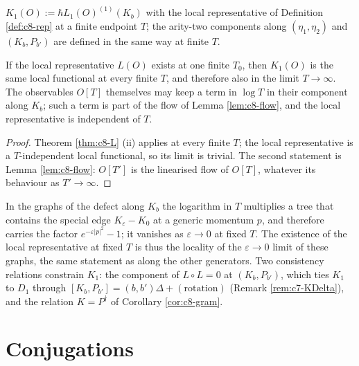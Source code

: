 \begin{definition}
\label{def:c8-K}
$K_1(O):=\hbar L_1(O)^{(1)}(K_b)$ with the local representative of Definition \ref{def:c8-rep} at a finite endpoint $T$; the arity-two components along $(\eta_1,\eta_2)$ and $(K_b,P_{b'})$ are defined in the same way at finite $T$.
\end{definition}

\begin{theorem}
\label{thm:c8-K}
If the local representative $L(O)$ exists at one finite $T_0$, then $K_1(O)$ is the same local functional at every finite $T$, and therefore also in the limit $T\to\infty$. The observables $O[T]$ themselves may keep a term in $\log T$ in their component along $K_b$; such a term is part of the flow of Lemma \ref{lem:c8-flow}, and the local representative is independent of $T$.
\end{theorem}

\begin{proof}
Theorem \ref{thm:c8-L} (ii) applies at every finite $T$; the local representative is a $T$-independent local functional, so its limit is trivial. The second statement is Lemma \ref{lem:c8-flow}: $O[T']$ is the linearised flow of $O[T]$, whatever its behaviour as $T'\to\infty$.
\end{proof}

\begin{remark}
In the graphs of the defect along $K_b$ the logarithm in $T$ multiplies a tree that contains the special edge $K_\varepsilon-K_0$ at a generic momentum $p$, and therefore carries the factor $e^{-\varepsilon|p|^2}-1$; it vanishes as $\varepsilon\to0$ at fixed $T$. The existence of the local representative at fixed $T$ is thus the locality of the $\varepsilon\to0$ limit of these graphs, the same statement as along the other generators. Two consistency relations constrain $K_1$: the component of $L\circ L=0$ at $(K_b,P_{b'})$, which ties $K_1$ to $D_1$ through $[K_b,P_{b'}]=(b,b')\Delta+(\text{rotation})$ (Remark \ref{rem:c7-KDelta}), and the relation $K=P^\dagger$ of Corollary \ref{cor:c8-gram}.
\end{remark}

\section{Conjugations}


